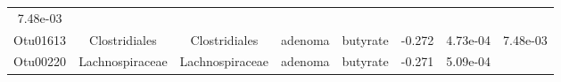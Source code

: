 \documentclass[11pt,]{article}
\begin{document}
\begin{longtable}[]{@{}cccccccc@{}}
\begin{minipage}[t]{0.08\columnwidth}
7.48e-03\strut
\end{minipage}\tabularnewline
\begin{minipage}[t]{0.08\columnwidth}\centering\strut
Otu01613\strut
\end{minipage} & \begin{minipage}[t]{0.15\columnwidth}\centering\strut
Clostridiales\strut
\end{minipage} & \begin{minipage}[t]{0.15\columnwidth}\centering\strut
Clostridiales\strut
\end{minipage} & \begin{minipage}[t]{0.08\columnwidth}\centering\strut
adenoma\strut
\end{minipage} & \begin{minipage}[t]{0.09\columnwidth}\centering\strut
butyrate\strut
\end{minipage} & \begin{minipage}[t]{0.07\columnwidth}\centering\strut
-0.272\strut
\end{minipage} & \begin{minipage}[t]{0.08\columnwidth}\centering\strut
4.73e-04\strut
\end{minipage} & \begin{minipage}[t]{0.08\columnwidth}\centering\strut
7.48e-03\strut
\end{minipage}\tabularnewline
\begin{minipage}[t]{0.08\columnwidth}\centering\strut
Otu00220\strut
\end{minipage} & \begin{minipage}[t]{0.15\columnwidth}\centering\strut
Lachnospiraceae\strut
\end{minipage} & \begin{minipage}[t]{0.15\columnwidth}\centering\strut
Lachnospiraceae\strut
\end{minipage} & \begin{minipage}[t]{0.08\columnwidth}\centering\strut
adenoma\strut
\end{minipage} & \begin{minipage}[t]{0.09\columnwidth}\centering\strut
butyrate\strut
\end{minipage} & \begin{minipage}[t]{0.07\columnwidth}\centering\strut
-0.271\strut
\end{minipage} & \begin{minipage}[t]{0.08\columnwidth}\centering\strut
5.09e-04\strut
\end{minipage} & \begin{minipage}[t]{0.08\columnwidth}\centering\strut

\end{minipage}
\end{longtable}
\end{document}

